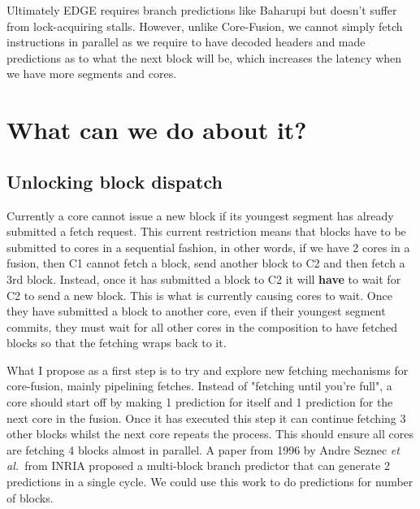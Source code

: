 Ultimately EDGE requires branch predictions like Baharupi but doesn't suffer from lock-acquiring stalls.
However, unlike Core-Fusion, we cannot simply fetch instructions in parallel as we require to have decoded headers and made predictions as to what the next block will be, which increases the latency when we have more segments and cores.

\section{What can we do about it?}

\subsection{Unlocking block dispatch}

Currently a core cannot issue a new block if its youngest segment has already submitted a fetch request.
This current restriction means that blocks have to be submitted to cores in a sequential fashion, in other words, if we have 2 cores in a fusion, then C1 cannot fetch a block, send another block to C2 and then fetch a 3rd block. Instead, once it has submitted a block to C2 it will \textbf{have} to wait for C2 to send a new block.
This is what is currently causing cores to wait. Once they have submitted a block to another core, even if their youngest segment commits, they must wait for all other cores in the composition to have fetched blocks so that the fetching wraps back to it.

What I propose as a first step is to try and explore new fetching mechanisms for core-fusion, mainly pipelining fetches.
Instead of "fetching until you're full", a core should start off by making 1 prediction for itself and 1 prediction for the next core in the fusion.
Once it has executed this step it can continue fetching 3 other blocks whilst the next core repeats the process.
This should ensure all cores are fetching 4 blocks almost in parallel.
A paper from 1996 by Andre Seznec {\it et al.~}from INRIA proposed a multi-block branch predictor that can generate 2 predictions in a single cycle.
We could use this work to do predictions for number of blocks.

